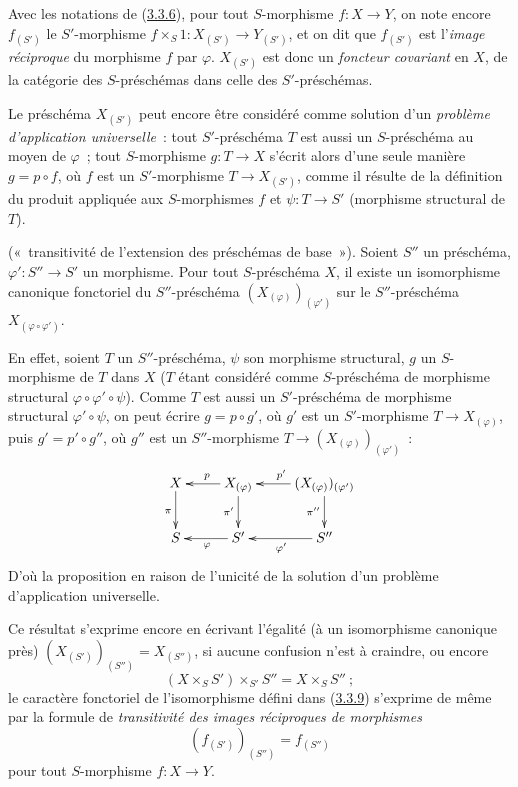 \begin{env}[3.3.7]
\label{I.3.3.7-fr}
Avec les notations de (\hyperref[I.3.3.6-fr]{3.3.6}), pour tout
$S$-morphisme $f:X\to Y$, on note encore $f_{(S')}$ le $S'$-morphisme
$f\times_S 1:X_{(S')}\to Y_{(S')}$, et on dit que $f_{(S')}$ est
l'\emph{image réciproque} du morphisme $f$ par $\varphi$. $X_{(S')}$ est donc
un \emph{foncteur covariant} en $X$, de la catégorie des $S$-préschémas dans
celle des $S'$-préschémas.
\end{env}

\begin{env}[3.3.8]
\label{I.3.3.8-fr}
Le préschéma $X_{(S')}$ peut encore être considéré comme solution d'un
\emph{problème d'application universelle}~: tout $S'$-préschéma $T$ est aussi
un $S$-préschéma au moyen de $\varphi$~; tout $S$-morphisme $g:T\to X$
s'écrit alors d'une seule manière $g=p\circ f$, où $f$ est un
$S'$-morphisme $T\to X_{(S')}$, comme il résulte de la définition du produit
appliquée aux $S$-morphismes $f$ et $\psi:T\to S'$ (morphisme structural de
$T$).
\end{env}

\begin{proposition}[3.3.9]
\label{I.3.3.9-fr}
\textup{(«~transitivité de l'extension des préschémas de base~»).} Soient
$S''$ un préschéma, $\varphi':S''\to S'$ un morphisme. Pour tout
$S$-préschéma $X$, il existe un isomorphisme canonique fonctoriel du
$S''$-préschéma $(X_{(\varphi)})_{(\varphi')}$ sur le $S''$-préschéma
$X_{(\varphi\circ\varphi')}$.
\end{proposition}

En effet, soient $T$ un $S''$-préschéma, $\psi$ son morphisme structural,
$g$ un $S$-morphisme de $T$ dans $X$ ($T$ étant considéré comme
$S$-préschéma de morphisme structural $\varphi\circ\varphi'\circ\psi$).
Comme $T$ est aussi un $S'$-préschéma de morphisme structural
$\varphi'\circ\psi$, on peut écrire $g=p\circ g'$, où $g'$ est un
$S'$-morphisme $T\to X_{(\varphi)}$, puis $g'=p'\circ g''$, où $g''$ est un
$S''$-morphisme $T\to(X_{(\varphi)})_{(\varphi')}$~:
\label{I.3.3.9.transitivity-diagram-fr}
\[
  \xymatrix{
    X\ar[d]_{\pi} &
    X_{(\varphi)}\ar[l]_{p}\ar[d]_{\pi'} &
    (X_{(\varphi)})_{(\varphi')}\ar[l]_{p'}\ar[d]_{\pi''}\\
    S & S'\ar[l]^{\varphi} & S''\ar[l]^{\varphi'}
  }
\]
D'où la proposition en raison de l'unicité de la solution d'un problème
d'application universelle.

Ce résultat s'exprime encore en écrivant l'égalité (à un isomorphisme
canonique près) $(X_{(S')})_{(S'')}=X_{(S'')}$, si aucune confusion n'est à
craindre, ou encore
\begin{equation}
  (X\times_S S')\times_{S'}S''=X\times_S S''~;
  \tag{3.3.9.1}\label{I.3.3.9.1-fr}
\end{equation}
le caractère fonctoriel de l'isomorphisme défini dans
(\hyperref[I.3.3.9-fr]{3.3.9}) s'exprime de même par la formule de
\emph{transitivité des images réciproques de morphismes}
\begin{equation}
  (f_{(S')})_{(S'')}=f_{(S'')}
  \tag{3.3.9.2}\label{I.3.3.9.2-fr}
\end{equation}
pour tout $S$-morphisme $f:X\to Y$.

